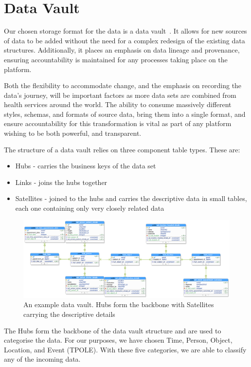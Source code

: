 \section{Data Vault}
Our chosen storage format for the data is a data vault~\cite{Linstedt2015}. It allows for new sources of data to be added without the need for a complex redesign of the existing data structures. Additionally, it places an emphasis on data lineage and provenance, ensuring accountability is maintained for any processes taking place on the platform. 

Both the flexibility to accommodate change, and the emphasis on recording the data's journey, will be important factors as more data sets are combined from health services around the world. The ability to consume massively different styles, schemas, and formats of source data, bring them into a single format, and ensure accountability for this transformation is vital as part of any platform wishing to be both powerful, and transparent.

The structure of a data vault relies on three component table types. These are:
\begin{itemize}
    \item Hubs - carries the business keys of the data set
    \item Links - joins the hubs together
    \item Satellites - joined to the hubs and carries the descriptive data in small tables, each one containing only very closely related data
\end{itemize}

\begin{figure}[H]
    \includegraphics[width=12cm]{images/tpole_plus_sats.png}
    \caption{An example data vault. Hubs form the backbone with Satellites carrying the descriptive details} 
    \label{fig:tpole_sats}
\end{figure}

The Hubs form the backbone of the data vault structure and are used to categorise the data. For our purposes, we have chosen Time, Person, Object, Location, and Event (TPOLE). With these five categories, we are able to classify any of the incoming data. 

